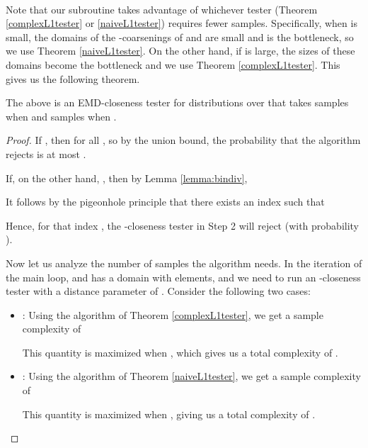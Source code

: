 \documentclass[11pt]{article}
\begin{document}
\\
\begin{algorithm}[H]

  \For { \KwTo } {
     {
    }
  }
\end{algorithm}


Note that our subroutine takes advantage of whichever tester (Theorem \ref{complexL1tester}
or \ref{naiveL1tester}) requires fewer samples. Specifically, when  is small,
the domains of the -coarsenings of  and  are small and  is the bottleneck,
so we use Theorem \ref{naiveL1tester}. On the other hand, if  is large, the sizes of
these domains become the bottleneck and we use Theorem \ref{complexL1tester}. This gives us
the following theorem.

\begin{theorem}
  The above is an EMD-closeness tester for distributions over  that
  takes  samples when  and
   samples when .
\end{theorem}
\begin{proof}
  If , then  for all , so by the union bound, the probability that
  the algorithm rejects is at most . 

  If, on the other hand, , then by Lemma {\ref{lemma:bindiv}},
  
  It follows by the pigeonhole principle that there exists an index  such that
  
  Hence, for that index , the -closeness tester in Step 2 will reject (with
  probability ).
  
  Now let us analyze the number of samples the algorithm needs. In the  iteration of
  the main loop,  and  has a domain with  elements, and we
  need to run an -closeness tester with a distance parameter of
  . Consider the following
  two cases:
  \begin{itemize}
    \item : Using the algorithm of Theorem \ref{complexL1tester}, we get a sample
    complexity of
    
    This quantity is maximized when , which gives us a total
    complexity of .
    
    \item : Using the algorithm of Theorem \ref{naiveL1tester}, we get a sample
    complexity of
    
    This quantity is maximized when , giving us a total complexity of
    .
  \end{itemize}
\end{proof}
\end{document}
